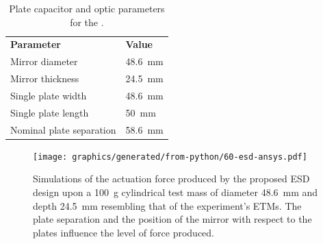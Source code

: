 \begin{table}
  \centering
  \begin{tabular}{ll}
    \textbf{Parameter}   & \textbf{Value} \\
    Mirror diameter      & \SI{48.6}{\milli\meter} \\
    Mirror thickness     & \SI{24.5}{\milli\meter} \\
    Single plate width   & \SI{48.6}{\milli\meter} \\
    Single plate length  & \SI{50}{\milli\meter} \\
    Nominal plate separation & \SI{58.6}{\milli\meter} \\
  \end{tabular}
  \caption[Plate capacitor and optic parameters for the \SSMEXPT{}]{\label{tab:ssm-esd-parameters}Plate capacitor and optic parameters for the \SSMEXPT{}.}
\end{table}

\begin{figure}
  \centering
  \texttt{[image: graphics/generated/from-python/60-esd-ansys.pdf]}
  \caption[Simulations of the actuation force produced by the proposed electrostatic drive design]{\label{fig:ssm-esd-ansys}Simulations of the actuation force produced by the proposed \gls{ESD} design upon a \SI{100}{\gram} cylindrical test mass of diameter \SI{48.6}{\milli\meter} and depth \SI{24.5}{\milli\meter} resembling that of the \SSM experiment's ETMs. The plate separation and the position of the mirror with respect to the plates influence the level of force produced. }
\end{figure}

